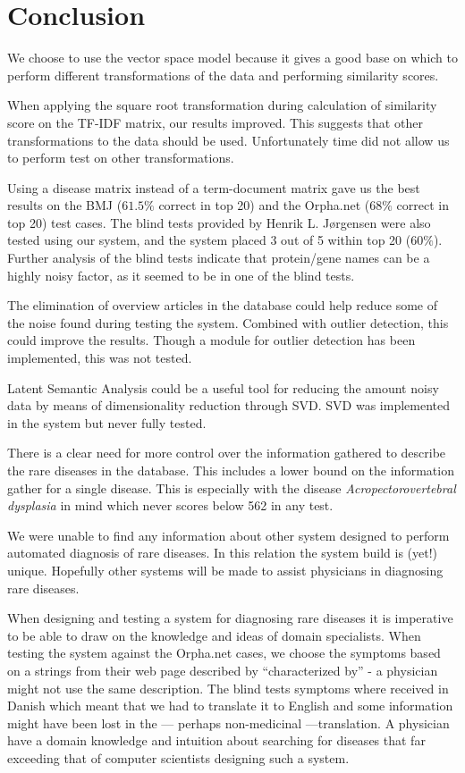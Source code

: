\chapter{Conclusion\label{Conclusion}}

We choose to use the vector space model because it gives a good base
on which to perform different transformations of the data and performing
similarity scores.

When applying the square root transformation during calculation of
similarity score on the TF-IDF matrix, our results improved. This
suggests that other transformations to the data should be
used. Unfortunately time did not allow us to perform test on other
transformations.

Using a disease matrix instead of a term-document matrix gave us the best
results on the BMJ ($61.5\%$ correct in top 20) and the Orpha.net ($68\%$ correct in top 20) 
test cases. The blind tests provided by Henrik L. J\o rgensen were also tested
using our system, and the system placed 3 out of 5 within top
20 ($60\%$). Further analysis of the blind tests indicate that protein/gene names
can be a highly noisy factor, as it seemed to be in one of the blind
tests.

The elimination of overview articles in the database could help reduce
some of the noise found during testing the system. Combined with
outlier detection, this could improve the results.
Though a module for outlier detection has been implemented, this was 
not tested.

Latent Semantic Analysis could be a useful tool for reducing the amount 
noisy data by means of dimensionality reduction through SVD. SVD was 
implemented in the system but never fully tested.

There is a clear need for more control over the information gathered to
describe the rare diseases in the database. This includes a lower
bound on the information gather for a single disease. This is
especially with the disease \textit{Acropectorovertebral dysplasia} in mind which never
scores below 562 in any test.

We were unable to find any information about other system designed to
perform automated diagnosis of rare diseases. In this relation
the system build is (yet!) unique. Hopefully other systems will be
made to assist physicians in diagnosing rare diseases.

When designing and testing a system for diagnosing rare diseases it is
imperative to be able to draw on the knowledge and ideas of domain
specialists. When testing the system against the Orpha.net cases, we
choose the symptoms based on a strings from their web page described
by ``characterized by'' - a physician might not use the same
description. The blind tests symptoms where received in Danish which
meant that we had to translate it to English and some information
might have been lost in the --- perhaps non-medicinal ---translation. A physician have a domain
knowledge and intuition about searching for diseases that far exceeding
that of computer scientists designing such a system.

